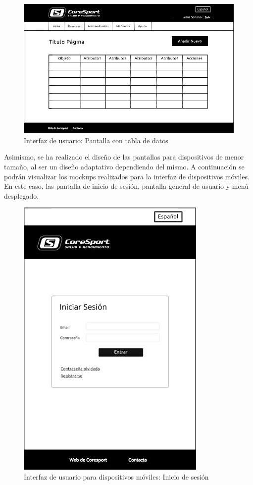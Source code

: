 \begin{figure}
\centering
  \includegraphics[scale=.40]{img/interfaz/cuadro-general.jpg}
  \caption{Interfaz de usuario: Pantalla con tabla de datos}
  \label{fig:interfaz-cuadro-general}
\end{figure}


Asimismo, se ha realizado el diseño de las pantallas para dispositivos de menor tamaño, al ser un diseño adaptativo dependiendo del mismo. A continuación se podrán visualizar los mockups realizados para la interfaz de dispositivos móviles. En este caso, las pantalla de inicio de sesión, pantalla general de usuario y menú desplegado.


\begin{figure}[H]
\centering
  \includegraphics[scale=.50]{img/interfaz/inicio-sesion-movil.jpg}
  \caption{Interfaz de usuario para dispositivos móviles: Inicio de sesión}
  \label{fig:interfaz-inicio-sesion-movil}
\end{figure}

